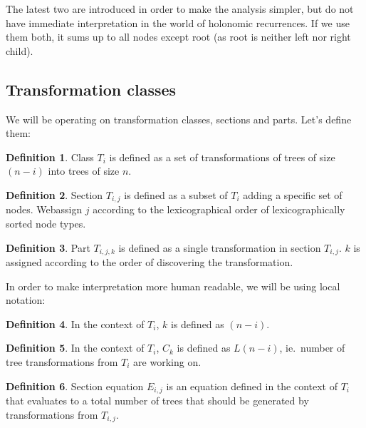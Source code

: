 \documentclass[final]{article}
\theoremstyle{definition}
\newtheorem{definition}{Definition}[subsection]
\theoremstyle{remark}
\begin{document}
The latest two are introduced in order to make the analysis simpler, but do not have immediate interpretation in the world of holonomic recurrences. If we use them both, it sums up to all nodes except root (as root is neither left nor right child).


\subsection{Transformation classes}%
\label{sub:transformation_classes}

We will be operating on transformation classes, sections and parts. Let's define them:

\begin{definition}
    Class \(T_i\) is defined as a set of transformations of trees of size \((n - i)\) into trees of size \(n\).
\end{definition}

\begin{definition}
    Section \(T_{i,j}\) is defined as a subset of \(T_i\) adding a specific set of nodes. Webassign \(j\) according to the lexicographical order of lexicographically sorted node types.
\end{definition}

\begin{definition}
    Part \(T_{i,j,k}\) is defined as a single transformation in section \(T_{i,j}\). \(k\) is assigned according to the order of discovering the transformation.
\end{definition}

In order to make interpretation more human readable, we will be using local notation:

\begin{definition}
    In the context of \(T_i\), \(k\) is defined as \((n - i)\).
\end{definition}

\begin{definition}
    In the context of \(T_i\), \(C_k\) is defined as \(L(n - i)\), ie.\ number of tree transformations from \(T_i\) are working on.
\end{definition}

\begin{definition}
    Section equation \(E_{i, j}\) is an equation defined in the context of \(T_i\) that evaluates to a total number of trees that should be generated by transformations from \(T_{i, j}\).
\end{definition}
\end{document}
